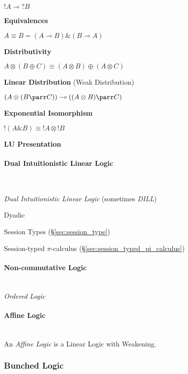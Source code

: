 $!A \multimap ?B$


\textbf{Equivalences}

$A \equiv B = (A \multimap B) \& (B \multimap A)$


\textbf{Distributivity}

$A \otimes (B \oplus C) \equiv (A \otimes B) \oplus (A \otimes C)$


\textbf{Linear Distribution} (Weak Distribution)

$(A \otimes (B \parr C)) \multimap ((A \otimes B) \parr C)$


\textbf{Exponential Isomorphism}

$!(A \& B) \equiv !A \otimes !B$


\textbf{LU Presentation}



\paragraph{Dual Intuitionistic Linear Logic}
\label{sec:dual_linear_logic}
\hfill \\

\cite{andreoli92}

\emph{Dual Intuitionistic Linear Logic} (sometimes \emph{DILL})

Dyadic

Session Types (\S\ref{sec:session_type})

Session-typed $\pi$-calculus (\S\ref{sec:session_typed_pi_calculus})



\paragraph{Non-commutative Logic}\label{sec:noncommutative_logic}
\hfill \\

\emph{Ordered Logic}



\paragraph{Affine Logic}\label{sec:affine_logic}
\hfill \\

An \emph{Affine Logic} is a Linear Logic with Weakening.



\subsubsection{Bunched Logic}\label{sec:bunched_logic}

